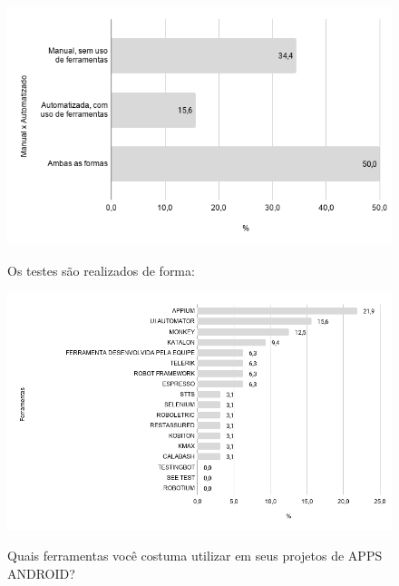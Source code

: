     
        \begin{figure}[!htb]
        \centering
        \includegraphics[width=.80\textwidth]{images/s_formatestes.png}
        \label{figure:s_formatestes}
        \caption{Os testes são realizados de forma:}
        \end{figure}    
    
    
        \begin{figure}[!htb]
        \centering
        \includegraphics[width=.80\textwidth]{images/s_ferramentastestes.png}
        \label{figure:s_ferramentastestes}
        \caption{Quais ferramentas você costuma utilizar em seus projetos de APPS ANDROID?}
        \end{figure}
    
